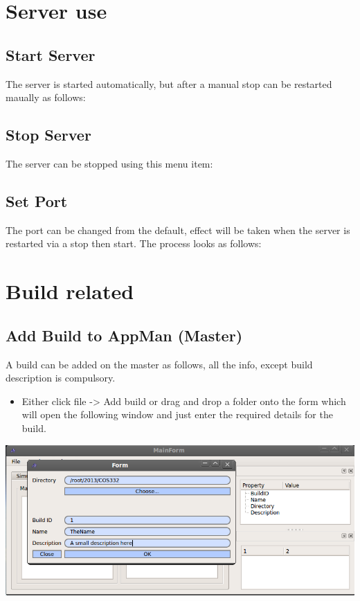 \documentclass[a4paper,12pt,final]{article}
\begin{document}
\section{Server use}

\subsection{Start Server}
The server is started automatically, but after a manual stop can be restarted maually as follows:

\subsection{Stop Server}
The server can be stopped using this menu item:

\subsection{Set Port}
The port can be changed from the default, effect will be taken when the server is restarted via a stop then start. The process looks as follows:

\section{Build related}

\subsection{Add Build to AppMan (Master)}
A build can be added on the master as follows, all the info, except build description is compulsory.

\begin{itemize}
\item Either click file -> Add build or drag and drop a folder onto the form which will open the following window and just enter the required details for the build.
\end{itemize}
\begin{center}
  	\includegraphics[scale=0.4]{AddBuildLinux.png}
 \end{center}
\end{document}
